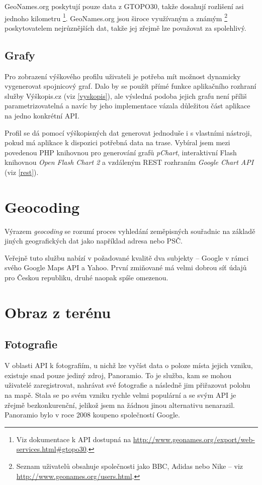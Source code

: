 GeoNames.org poskytují pouze data z
GTOPO30, takže dosahují rozlišení asi jednoho kilometru
\footnote{Viz dokumentace k API dostupná na
\url{http://www.geonames.org/export/web-services.html\#gtopo30}.}. GeoNames.org jsou široce využívaným a známým \footnote{Seznam uživatelů obsahuje společnosti jako BBC, Adidas nebo Nike -- viz \url{http://www.geonames.org/users.html}.} poskytovatelem nej\-růz\-něj\-ších dat, takže jej zřejmě lze považovat za spolehlivý.

\subsection{Grafy}\label{grafy}
Pro zobrazení výškového profilu uživateli je potřeba mít možnost
dynamicky vygenerovat spojnicový graf. Dalo by se použít přímé funkce
aplikačního rozhraní služby Výškopis.cz (viz \ref{vyskopis}), ale
výsledná podoba jejich grafu není příliš parametrizovatelná a navíc by
jeho implementace vázala důležitou část aplikace na jedno konkrétní API.

Profil se dá pomocí výškopisných dat generovat jednoduše i s
vlastními nástroji, pokud má aplikace k dispozici potřebná data na
trase. Vybíral jsem mezi povedenou PHP knihovnou pro generování
grafů {\it pChart}, interaktivní Flash knihovnou {\it Open Flash Chart
2} a vzdáleným REST rozhraním {\it Google Chart API} (viz \ref{rest}).

\section{Geocoding}
Výrazem {\it geocoding} se rozumí proces vyhledání zeměpisných
souřadnic na základě jiných geografických dat jako například adresa
nebo PSČ.

Veřejně tuto službu nabízí v požadované kvalitě dva subjekty --
Google v rámci svého Google Maps API a Yahoo. První zmiňované má
velmi dobrou síť údajů pro Českou republiku, druhé naopak spíše
omezenou.

\section{Obraz z terénu}
\subsection{Fotografie}
V oblasti API k fotografiím, u nichž lze vyčíst data o poloze místa
jejich vzniku, existuje snad pouze jediný zdroj, Panoramio. To je
služba, kam se mohou uživatelé zaregistrovat, nahrávat své fotografie
a následně jim přiřazovat polohu na mapě. Stala se po svém vzniku
rychle velmi populární \cite{panoramio} a se svým API je zřejmě bezkonkurenční,
jelikož jsem na žádnou jinou alternativu nenarazil. Panoramio bylo v
roce 2008 koupeno společností Google.

